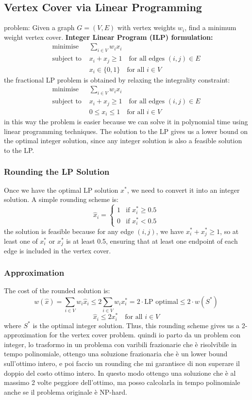 \documentclass[12pt,a4paper]{report}
\begin{document}
\subsection{Vertex Cover via Linear Programming}
problem: Given a graph $G=(V,E)$ with vertex weights $w_i$, find a minimum weight vertex cover.
\newline
\textbf{Integer Linear Program (ILP) formulation:}
\begin{align*}
\text{minimise } & \sum_{i \in V} w_i x_i \\
\text{subject to } & x_i + x_j \geq 1 \quad \text{for all edges } (i,j) \in E \\
& x_i \in \{0,1\} \quad \text{for all } i \in V
\end{align*}
the fractional LP problem is obtained by relaxing the integrality constraint:
\begin{align*}
\text{minimise } & \sum_{i \in V} w_i x_i \\
\text{subject to } & x_i + x_j \geq 1 \quad \text{for all edges } (i,j) \in E \\
& 0 \leq x_i \leq 1 \quad \text{for all } i \in V
\end{align*}
in this way the problem is easier because we can solve it in polynomial time using linear programming techniques. The solution to the LP gives us a lower bound on the optimal integer solution, since any integer solution is also a feasible solution to the LP.
\subsubsection{Rounding the LP Solution}
Once we have the optimal LP solution $x^*$, we need to convert it into an integer solution. A simple rounding scheme is:
\[
\hat{x}_i = \begin{cases}1 & \text{if } x_i^* \geq 0.5 \\0 & \text{if } x_i^* < 0.5\end{cases}
\]
the solution is feasible because for any edge $(i,j)$, we have $x_i^* + x_j^* \geq 1$, so at least one of $x_i^*$ or $x_j^*$ is at least 0.5, ensuring that at least one endpoint of each edge is included in the vertex cover.
\subsubsection{Approximation}
The cost of the rounded solution is:
\[
w(\hat{x}) = \sum_{i \in V} w_i \hat{x}_i \leq 2 \sum_{i \in V} w_i x_i^* = 2 \cdot \text{LP optimal} \leq 2 \cdot w(S^*)
\]
\[
\hat{x}_i \leq 2 x_i^* \quad \text{for all } i \in V
\]
where $S^*$ is the optimal integer solution. Thus, this rounding scheme gives us a 2-approximation for the vertex cover problem.
quindi io parto da un problem con integer, lo trasformo in un problema con varibili frazionarie che è risolvibile in tempo polinomiale, ottengo una soluzione frazionaria che è un lower bound sull'ottimo intero, e poi faccio un rounding che mi garantisce di non superare il doppio del costo ottimo intero. In questo modo ottengo una soluzione che è al massimo 2 volte peggiore dell'ottimo, ma posso calcolarla in tempo polinomiale anche se il problema originale è NP-hard.
\end{document}
